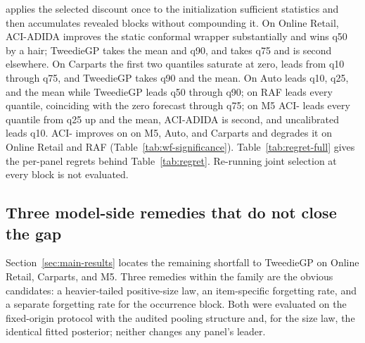 \EBB{} applies the selected discount once to the initialization
sufficient statistics and then accumulates revealed blocks without
compounding it. On Online Retail, ACI-ADIDA improves the static conformal
wrapper substantially and wins q50 by a hair; TweedieGP takes the mean
and q90, and \EBB{} takes q75 and is second elsewhere. On Carparts the
first two quantiles saturate at zero, \EBB{} leads from q10 through q75,
and TweedieGP takes q90 and the mean. On Auto \EBB{} leads q10, q25, and
the mean while TweedieGP leads q50 through q90; on RAF \EBB{} leads every
quantile, coinciding with the zero forecast through q75; on M5 ACI-\EBB{}
leads every quantile from q25 up and the mean, ACI-ADIDA is second, and
uncalibrated \EBB{} leads q10. ACI-\EBB{} improves on \EBB{} on M5, Auto,
and Carparts and degrades it on Online Retail and RAF
(Table~\ref{tab:wf-significance}).
Table~\ref{tab:regret-full} gives the per-panel regrets behind
Table~\ref{tab:regret}. Re-running joint selection at every block is not
evaluated.


\subsection{Three model-side remedies that do not close the gap}
\label{app:negative}

Section~\ref{sec:main-results} locates the remaining shortfall to
TweedieGP on Online Retail, Carparts, and M5. Three remedies within the
\EBB{} family are the obvious candidates: a heavier-tailed positive-size
law, an item-specific forgetting rate, and a separate forgetting rate for
the occurrence block. Both were evaluated on the
fixed-origin protocol with the audited pooling structure and, for the
size law, the identical fitted posterior; neither changes any panel's
leader.

